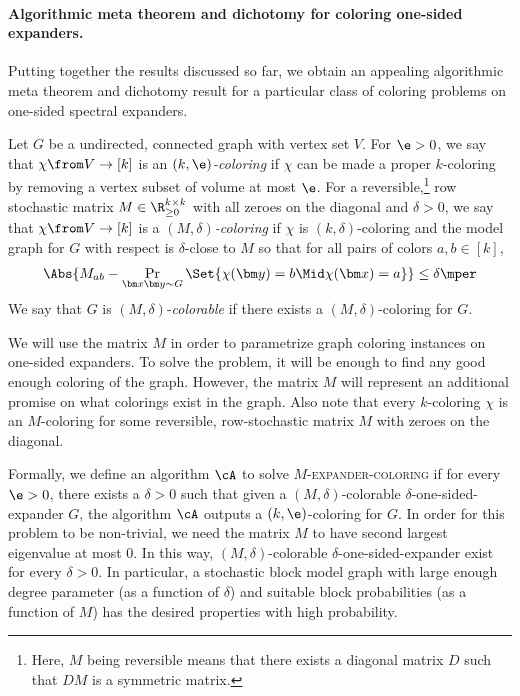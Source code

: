 \paragraph{Algorithmic meta theorem and dichotomy for coloring one-sided expanders.}

Putting together the results discussed so far, we obtain an appealing algorithmic meta theorem and dichotomy result for a particular class of coloring problems on one-sided spectral expanders.

Let \(G\) be a undirected, connected graph with vertex set \(V\).
For \(\e>0\), we say that \(\chi\from V\to[k]\) is an \emph{\((k,\e)\)-coloring} if \(\chi\) can be made a proper \(k\)-coloring by removing a vertex subset of volume at most \(\e\).
For a reversible,\footnote{Here, \(M\) being reversible means that there exists a diagonal matrix \(D\) such that \(D M\) is a symmetric matrix.} row stochastic matrix \(M\in \R_{\ge 0}^{k\times k}\) with all zeroes on the diagonal and \(\delta>0\), we say that \(\chi\from V\to [k]\) is a \emph{\((M,\delta)\)-coloring} if \(\chi\) is \((k,\delta)\)-coloring and the model graph for \(G\) with respect is \(\delta\)-close to \(M\) so that for all pairs of colors \(a,b\in [k]\),
\begin{equation}
  \Abs{M_{ab} - \Pr_{\bm x\bm y \sim G}\Set{\chi(\bm y)=b\Mid \chi(\bm x)=a}}
  \le \delta\mper
\end{equation}
We say that \(G\) is \((M,\delta)\)-\emph{colorable} if there exists a \((M,\delta)\)-coloring for \(G\).

We will use the matrix \(M\) in order to parametrize graph coloring instances on one-sided expanders.
To solve the problem, it will be enough to find any good enough coloring of the graph.
However, the matrix \(M\) will represent an additional promise on what colorings exist in the graph.
Also note that every \(k\)-coloring \(\chi\) is an \(M\)-coloring for some reversible, row-stochastic matrix \(M\) with zeroes on the diagonal.

Formally, we define an algorithm \(\cA\) to solve \(M\)-\textsc{expander-coloring} if for every \(\e>0\), there exists a \(\delta>0\) such that given a \((M,\delta)\)-colorable \(\delta\)-one-sided-expander \(G\), the algorithm \(\cA\) outputs a \((k,\e)\)-coloring for \(G\).
In order for this problem to be non-trivial, we need the matrix \(M\) to have second largest eigenvalue at most \(0\).
In this way, \((M,\delta)\)-colorable \(\delta\)-one-sided-expander exist for every \(\delta>0\).
In particular, a stochastic block model graph with large enough degree parameter (as a function of \(\delta\)) and suitable block probabilities (as a function of \(M\)) has the desired properties with high probability.

